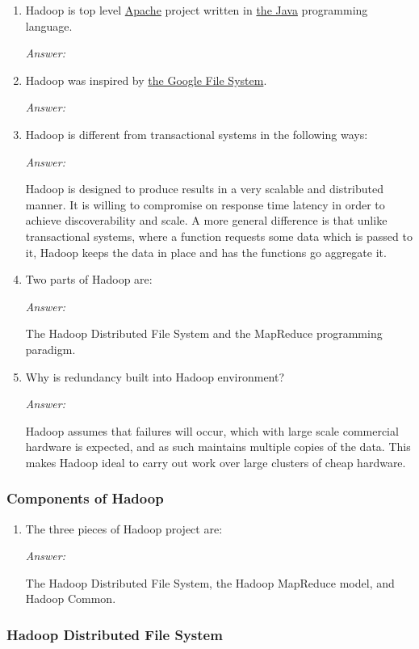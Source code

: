 \documentclass[11pt]{article}
\newcommand{\blank}[1]{\underline{#1}}
\newcommand{\answer}{\vspace{0.25em}\par\textit{Answer:}\vspace{0.25em}\par}
\begin{document}
\begin{enumerate}
  \item Hadoop is top level \blank{Apache} project written in \blank{the Java}
    programming language.
    \answer
  \item Hadoop was inspired by \blank{the Google File System}.
    \answer
  \item Hadoop is different from transactional systems in the following ways:
    \answer Hadoop is designed to produce results in a very scalable
    and distributed manner. It is willing to compromise on response
    time latency in order to achieve discoverability and scale. A
    more general difference is that unlike transactional systems,
    where a function requests some data which is passed to it, Hadoop
    keeps the data in place and has the functions go aggregate it.
  \item Two parts of Hadoop are:
    \answer The Hadoop Distributed File System and the MapReduce
    programming paradigm.
  \item Why is redundancy built into Hadoop environment?
    \answer Hadoop assumes that failures will occur, which with large
    scale commercial hardware is expected, and as such maintains
    multiple copies of the data. This makes Hadoop ideal to carry out
    work over large clusters of cheap hardware.
\end{enumerate}

\subsubsection*{Components of Hadoop}

\begin{enumerate}
  \item The three pieces of Hadoop project are:
    \answer The Hadoop Distributed File System, the Hadoop MapReduce
    model, and Hadoop Common.
\end{enumerate}

\subsubsection*{Hadoop Distributed File System}
\end{document}
